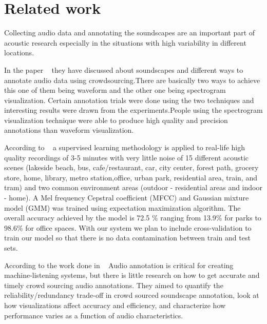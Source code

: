 
\section{Related work}
Collecting audio data and annotating the soundscapes are an important part of acoustic research especially in the situations with high variability in different locations.

In the paper ~\cite{5} they have discussed about soundscapes and different ways to annotate audio data using crowdsourcing.There are basically two ways to achieve this one of them being waveform and the other one being spectrogram visualization. Certain annotation trials were done using the two techniques and interesting results were drawn from the experiments.People using the spectrogram visualization technique were able to produce high quality and precision annotations than waveform visualization.

According to ~\cite{6} a supervised learning methodology is applied to real-life high quality recordings of 3-5 minutes with very little noise of 15 different acoustic scenes (lakeside beach, bus, cafe/restaurant, car, city center, forest path, grocery store, home, library, metro station,office, urban park, residential area, train, and tram) and two common environment areas (outdoor - residential areas and indoor - home). A Mel frequency Cepstral coefficient (MFCC) and Gaussian mixture model (GMM) was trained using expectation maximization algorithm. The overall accuracy achieved by the model is 72.5 \% ranging from 13.9\% for parks to 98.6\% for office spaces. With our system we plan to include cross-validation to train our model so that there is no data contamination between train and test sets.

According to the work done in ~\cite{4} Audio annotation is critical for creating machine-listening systems, but there is little research on how to get accurate and timely crowd sourcing audio annotations. They aimed to quantify the reliability/redundancy trade-off in crowd sourced soundscape annotation, look at how visualizations affect accuracy and efficiency, and characterize how performance varies as a function of audio characteristics.   

